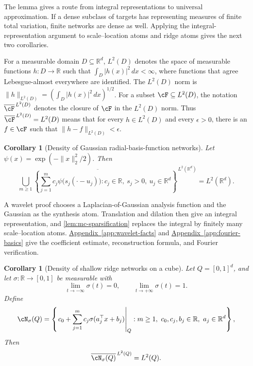 \documentclass[11pt,twoside]{article}
\newcommand{\appendixref}[1]{\hyperref[#1]{Appendix~\ref*{#1}}}
\newcommand{\R}{\mathbb R}
\newtheorem{corollary}[theorem]{Corollary}
\theoremstyle{definition}
\theoremstyle{remark}
\begin{document}
The lemma gives a route from integral representations to universal
approximation. If a dense subclass of targets has representing measures of
finite total variation, finite networks are dense as well. Applying the
integral-representation argument to scale--location atoms and ridge atoms gives the next two
corollaries.

For a measurable domain \(D\subseteq\R^d\), \(L^2(D)\) denotes the space of
measurable functions \(h:D\to\R\)
such that \(\int_D|h(x)|^2\,dx<\infty\), where functions that agree
Lebesgue-almost everywhere are identified. The \(L^2(D)\) norm is
\(\|h\|_{L^2(D)}=(\int_D|h(x)|^2\,dx)^{1/2}\). For a subset
\(\cF\subseteq L^2(D)\), the notation
\(\overline{\cF}^{\,L^2(D)}\) denotes the closure of \(\cF\) in the
\(L^2(D)\) norm. Thus
\(\overline{\cF}^{\,L^2(D)}=L^2(D)\) means that for every
\(h\in L^2(D)\) and every \(\epsilon>0\), there is an \(f\in\cF\) such
that \(\|h-f\|_{L^2(D)}<\epsilon\).

\begin{corollary}[Density of Gaussian radial-basis-function networks]
\label{cor:rbf-density}
Let \(\psi(x)=\exp(-\|x\|_2^2/2)\). Then
\begin{equation}
 \overline{\bigcup_{m\geq1}
 \left\{\sum_{j=1}^m c_j
 \psi\bigl(s_j(\cdot-u_j)\bigr):
 c_j\in\R,\ s_j>0,\ u_j\in\R^d\right\}}^{\,L^2(\R^d)}
 =L^2(\R^d).
 \label{eq:rbf-density}
\end{equation}
\end{corollary}

A wavelet proof chooses a Laplacian-of-Gaussian analysis function and the
Gaussian as the synthesis atom. Translation and dilation then give an
integral representation, and \cref{lem:mc-sparsification} replaces the
integral by finitely many scale--location atoms.
\appendixref{app:wavelet-facts} and \appendixref{app:fourier-basics} give the
coefficient estimate, reconstruction formula, and Fourier verification.

\begin{corollary}[Density of shallow ridge networks on a cube]
\label{cor:ridge-density}
Let \(Q=[0,1]^d\), and let \(\sigma:\R\to[0,1]\) be measurable with
\begin{equation}
 \lim_{t\to-\infty}\sigma(t)=0,
 \qquad
 \lim_{t\to+\infty}\sigma(t)=1.
 \label{eq:sigmoidal-activation}
\end{equation}
Define
\begin{equation}
 \cN_\sigma(Q)
 =\left\{\left.
 c_0+\sum_{j=1}^m c_j\sigma(a_j^\top x+b_j)
 \right|_Q:
 m\geq1,\ c_0,c_j,b_j\in\R,\ a_j\in\R^d\right\},
 \label{eq:finite-ridge-class}
\end{equation}
Then
\begin{equation}
 \overline{\cN_\sigma(Q)}^{\,L^2(Q)}=L^2(Q).
 \label{eq:ridge-density}
\end{equation}
\end{corollary}
\end{document}
